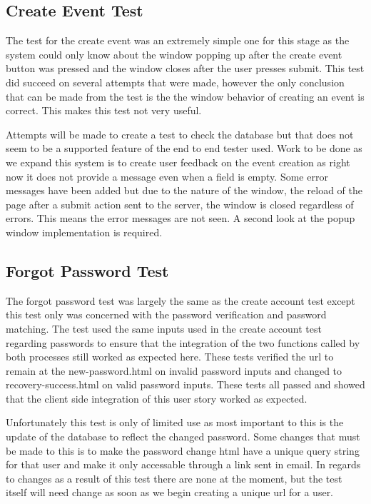 \documentclass[a4paper]{article}
\begin{document}
\subsection{Create Event Test}

The test for the create event was an extremely simple one for this stage as the system could only know about the window popping up after the create event button was pressed and the window closes after the user presses submit. 
This test did succeed on several attempts that were made, however the only conclusion that can be made from the test is the the window behavior of creating an event is correct.
This makes this test not very useful.

Attempts will be made to create a test to check the database but that does not seem to be a supported feature of the end to end tester used.
Work to be done as we expand this system is to create user feedback on the event creation as right now it does not provide a message even when a field is empty.
Some error messages have been added but due to the nature of the window, the reload of the page after a submit action sent to the server, the window is closed regardless of errors.
This means the error messages are not seen.
A second look at the popup window implementation is required.

\subsection{Forgot Password Test}

The forgot password test was largely the same as the create account test except this test only was concerned with the password verification and password matching.
The test used the same inputs used in the create account test regarding passwords to ensure that the integration of the two functions called by both processes still worked as expected here.
These tests verified the url to remain at the new-password.html on invalid password inputs and changed to recovery-success.html on valid password inputs.
These tests all passed and showed that the client side integration of this user story worked as expected.

Unfortunately this test is only of limited use as most important to this is the update of the database to reflect the changed password.
Some changes that must be made to this is to make the password change html have a unique query string for that user and make it only accessable through a link sent in email. 
In regards to changes as a result of this test there are none at the moment, but the test itself will need change as soon as we begin creating a unique url for a user.
\end{document}
